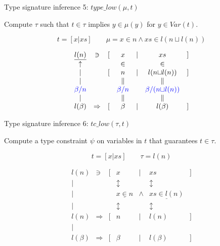 \documentclass{beamer}
\def\land{\wedge}
\def\tor{{\sqcup} }
\def\pspace{\vspace*{\fill}}
\begin{document}
\begin{frame}{Type signature inference 5: ${type\_low}(\mu,t)$}

Compute $\tau$ such that $t\in{\tau}$ implies $y\in\mu(y)$ for
$y\in Var(t)$.

\pspace

\[ t=[x|xs] \qquad \mu=x\in{n}\land xs\in {l}({n}\tor{l}({n})) \]

\begin{displaymath}
\begin{array}{cclcccr}
\underline{{l}({{n}})} &\ni & [ & x & | & xs & ]\\
   \uparrow         &    &   & {\in} &  & {\in} &\\
   |         &    & [ & {n} & |  & {l}({n}\tor{l}({n})) & ]\\
   |         &    &   & \| &  & \| &\\
{\color{blue}\beta/{n}} &  &   & {\color{blue}\beta/{n}} &  & {\color{blue}\beta/({n}\tor{l}({n}))} &\\
   |     &    &   & \| &  & \| &\\
{l}(\beta) &\Rightarrow & [ & \beta & | & {l}(\beta) & ]
\end{array}
\end{displaymath}

\pspace

\end{frame}

\begin{frame}{Type signature inference 6: ${tc\_low}(\tau,t)$}

\pspace

Compute a type constraint $\psi$ on variables in $t$ that
guarantees $t\in{\tau}$.


\pspace

\[ t=[x|xs] \qquad \tau={l}({n}) \]

\begin{displaymath}
\begin{array}{cclcccr}
{l}({{n}}) &\ni & [ & x & | & xs & ]\\
   |         &    &   & \updownarrow &  & \updownarrow &\\
   |         &    &  & \underline{x\in{n}} & \land  & \underline{xs\in{l}({n})} & \\
   |         &    &   & \updownarrow &  & \updownarrow &\\
{l}({n}) &\Rightarrow & [ & {n} & | & {l}({n}) & ]\\
   | & & & & & &\\
{l}(\beta) &\Rightarrow & [ & \beta & | & {l}(\beta) & ]
\end{array}
\end{displaymath}


\pspace

\end{frame}
\end{document}
